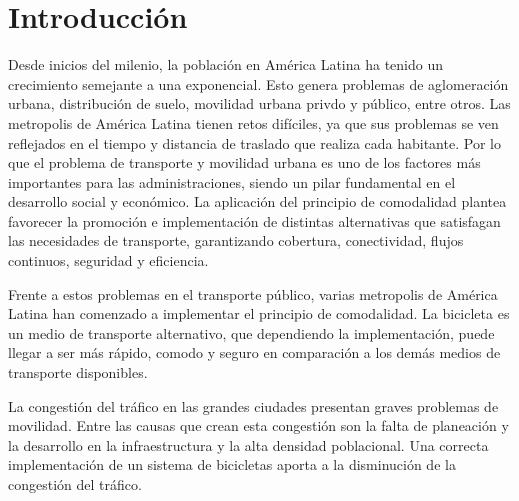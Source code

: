 \section{Introducción}

Desde inicios del milenio, la población en América Latina ha tenido un crecimiento semejante a una exponencial\cite{CEPAL_2015}. Esto genera problemas de aglomeración urbana, distribución de suelo, movilidad urbana privdo y público, entre otros. Las metropolis de América Latina tienen retos difíciles, ya que sus problemas se ven reflejados en el tiempo y distancia de traslado que realiza cada habitante\cite{hall_1978}. Por lo que el problema de transporte y movilidad urbana es uno de los factores más importantes para las administraciones, siendo un pilar fundamental en el desarrollo social y económico. La aplicación del principio de comodalidad plantea favorecer la promoción e implementación de distintas alternativas que satisfagan las necesidades de transporte, garantizando cobertura, conectividad, flujos continuos, seguridad y eficiencia\cite{pastori_2018}.

Frente a estos problemas en el transporte público, varias metropolis de América Latina han comenzado a implementar el principio de comodalidad. La bicicleta es un medio de transporte alternativo, que dependiendo la implementación, puede llegar a ser más rápido, comodo y seguro en comparación a los demás medios de transporte disponibles.

La congestión del tráfico en las grandes ciudades presentan graves problemas de movilidad. Entre las causas que crean esta congestión son la falta de planeación y la desarrollo en la infraestructura y la alta densidad poblacional. Una correcta implementación de un sistema de bicicletas aporta a la disminución de la congestión del tráfico.

